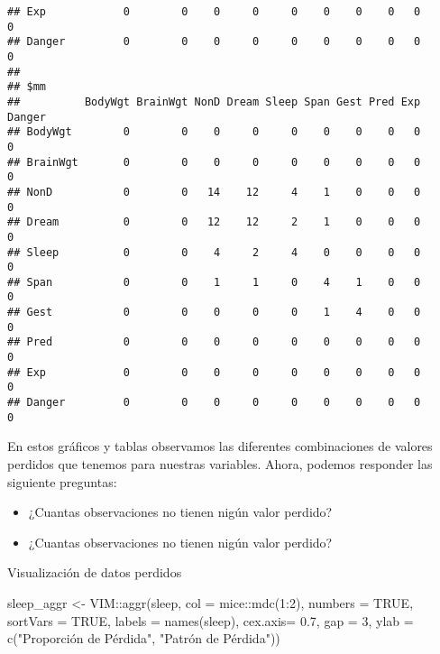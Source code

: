 \documentclass[
]{article}
\newenvironment{Shaded}{\begin{snugshade}}{\end{snugshade}}
\newcommand{\AttributeTok}[1]{\textcolor[rgb]{0.77,0.63,0.00}{#1}}
\newcommand{\ConstantTok}[1]{\textcolor[rgb]{0.00,0.00,0.00}{#1}}
\newcommand{\DecValTok}[1]{\textcolor[rgb]{0.00,0.00,0.81}{#1}}
\newcommand{\FloatTok}[1]{\textcolor[rgb]{0.00,0.00,0.81}{#1}}
\newcommand{\FunctionTok}[1]{\textcolor[rgb]{0.00,0.00,0.00}{#1}}
\newcommand{\NormalTok}[1]{#1}
\newcommand{\OtherTok}[1]{\textcolor[rgb]{0.56,0.35,0.01}{#1}}
\newcommand{\SpecialCharTok}[1]{\textcolor[rgb]{0.00,0.00,0.00}{#1}}
\newcommand{\StringTok}[1]{\textcolor[rgb]{0.31,0.60,0.02}{#1}}
\providecommand{\tightlist}{%
  \setlength{\itemsep}{0pt}\setlength{\parskip}{0pt}}
\begin{document}
\begin{verbatim}
## Exp            0        0    0     0     0    0    0    0   0      0
## Danger         0        0    0     0     0    0    0    0   0      0
## 
## $mm
##          BodyWgt BrainWgt NonD Dream Sleep Span Gest Pred Exp Danger
## BodyWgt        0        0    0     0     0    0    0    0   0      0
## BrainWgt       0        0    0     0     0    0    0    0   0      0
## NonD           0        0   14    12     4    1    0    0   0      0
## Dream          0        0   12    12     2    1    0    0   0      0
## Sleep          0        0    4     2     4    0    0    0   0      0
## Span           0        0    1     1     0    4    1    0   0      0
## Gest           0        0    0     0     0    1    4    0   0      0
## Pred           0        0    0     0     0    0    0    0   0      0
## Exp            0        0    0     0     0    0    0    0   0      0
## Danger         0        0    0     0     0    0    0    0   0      0
\end{verbatim}

En estos gráficos y tablas observamos las diferentes combinaciones de
valores perdidos que tenemos para nuestras variables. Ahora, podemos
responder las siguiente preguntas:

\begin{itemize}
\tightlist
\item
  ¿Cuantas observaciones no tienen nigún valor perdido?
\item
  ¿Cuantas observaciones no tienen nigún valor perdido?
\end{itemize}

Visualización de datos perdidos

\begin{Shaded}
\begin{Highlighting}[]
\NormalTok{sleep\_aggr }\OtherTok{\textless{}{-}}\NormalTok{ VIM}\SpecialCharTok{::}\FunctionTok{aggr}\NormalTok{(sleep, }\AttributeTok{col =}\NormalTok{ mice}\SpecialCharTok{::}\FunctionTok{mdc}\NormalTok{(}\DecValTok{1}\SpecialCharTok{:}\DecValTok{2}\NormalTok{), }\AttributeTok{numbers =} \ConstantTok{TRUE}\NormalTok{, }
                        \AttributeTok{sortVars =} \ConstantTok{TRUE}\NormalTok{, }\AttributeTok{labels =} \FunctionTok{names}\NormalTok{(sleep),}
                        \AttributeTok{cex.axis=} \FloatTok{0.7}\NormalTok{, }\AttributeTok{gap =} \DecValTok{3}\NormalTok{,}
                        \AttributeTok{ylab =} \FunctionTok{c}\NormalTok{(}\StringTok{"Proporción de Pérdida"}\NormalTok{,}
                                 \StringTok{"Patrón de Pérdida"}\NormalTok{))}
\end{Highlighting}
\end{Shaded}
\end{document}

